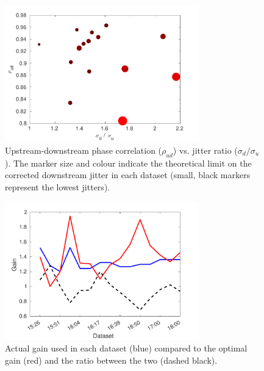 \begin{figure}
  \centering
  \includegraphics[width=0.75\textwidth]{Figures/feedforward/longFF_corrVsJitRat}
  \caption{Upstream-downstream phase correlation (\(\rho_{ud}\)) vs. jitter ratio (\(\sigma_d/\sigma_u\)). The marker size and colour indicate the theoretical limit on the corrected downstream jitter in each dataset (small, black markers represent the lowest jitters).}
  \label{f:longFF_corrVsJitRat}
\end{figure}

\begin{figure}
  \centering
  \includegraphics[width=0.75\textwidth]{Figures/feedforward/longFF_gain}
  \caption{Actual gain used in each dataset (blue) compared to the optimal gain (red) and the ratio between the two (dashed black).}
  \label{f:longFF_gain}
\end{figure}

